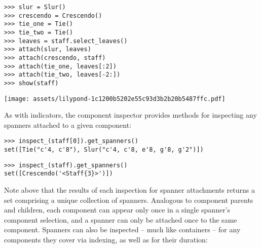 \begin{comment}
<abjad>
slur = Slur()
crescendo = Crescendo()
tie_one = Tie()
tie_two = Tie()
leaves = staff.select_leaves()
attach(slur, leaves)
attach(crescendo, staff)
attach(tie_one, leaves[:2])
attach(tie_two, leaves[-2:])
show(staff)
</abjad>
\end{comment}

\begin{abjadbookoutput}
\begin{singlespacing}
\vspace{-0.5\baselineskip}
\begin{verbatim}
>>> slur = Slur()
>>> crescendo = Crescendo()
>>> tie_one = Tie()
>>> tie_two = Tie()
>>> leaves = staff.select_leaves()
>>> attach(slur, leaves)
>>> attach(crescendo, staff)
>>> attach(tie_one, leaves[:2])
>>> attach(tie_two, leaves[-2:])
>>> show(staff)
\end{verbatim}
\noindent\texttt{[image: assets/lilypond-1c1200b5202e55c93d3b2b20b5487ffc.pdf]}
\end{singlespacing}
\end{abjadbookoutput}

\noindent As with indicators, the component inspector provides methods for
inspecting any spanners attached to a given component:

\begin{comment}
<abjad>
inspect_(staff[0]).get_spanners()
inspect_(staff).get_spanners()
</abjad>
\end{comment}

\begin{abjadbookoutput}
\begin{singlespacing}
\vspace{-0.5\baselineskip}
\begin{verbatim}
>>> inspect_(staff[0]).get_spanners()
set([Tie("c'4, c'8"), Slur("c'4, c'8, e'8, g'8, g'2")])
\end{verbatim}
\begin{verbatim}
>>> inspect_(staff).get_spanners()
set([Crescendo('<Staff{3}>')])
\end{verbatim}
\end{singlespacing}
\end{abjadbookoutput}

\noindent Note above that the results of each inspection for spanner
attachments returns a set comprising a unique collection of spanners. Analogous
to component parents and children, each component can appear only once in a
single spanner's component selection, and a spanner can only be attached once
to the same component. Spanners can also be inspected -- much like containers
-- for any components they cover via indexing, as well as for their duration:

